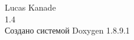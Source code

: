 \vspace*{7cm}
\begin{center}%
\LARGE {Lucas Kanade}\\\large{1.4}\\
\vspace*{1cm}
{\large Создано системой Doxygen 1.8.9.1}\\
\end{center}